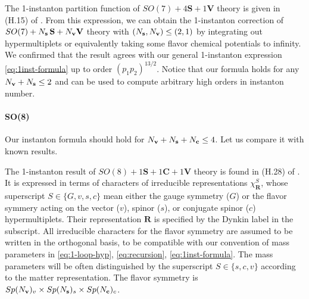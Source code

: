 \documentclass[letterpaper, 11pt]{article}
\begin{document}
{The 1-instanton partition function of $SO(7) + 4\mathbf{S} + 1\mathbf{V}$ theory is given in (H.15) of \cite{DelZotto:2018tcj}.
From this expression, we can obtain the 1-instanton correction of $SO(7) + N_{\bf s}\,\mathbf{S} + N_{\bf v}\mathbf{V}$ theory with $( N_{\bf s}, N_{\bf v}) \leq ( 2,1)$ by integrating out hypermultiplets or equivalently taking some flavor chemical potentials to infinity. We confirmed that the result agrees with our general 1-instanton expression \eqref{eq:1inst-formula} up to order $(p_1p_2)^{13/2}$. Notice that our formula holds for any $N_{\bf v} + N_{\bf s} \le 2$ and can be used to compute arbitrary high orders in instanton number. 

\paragraph{SO(8)}
Our instanton formula should hold for $N_{\bf v} + N_{\bf s} + N_{\bf c} \le 4$. Let us compare it with known results. 

The 1-instanton result of $SO(8) + 1\mathbf{S} + 1\mathbf{C} + 1\mathbf{V}$ theory is found in (H.28) of \cite{DelZotto:2018tcj}.
It is expressed in terms of characters of irreducible representations $\chi_{\mathbf{R}}^S$, whose superscript $S \in \{G,v,s,c\}$ mean either the gauge symmetry ($G$) or the flavor symmery acting on the vector ($v$), spinor ($s$), or conjugate spinor ($c$) hypermultiplets. Their representation $\mathbf{R}$ is specified by the Dynkin label in the subscript. All irreducible characters for the flavor symmetry are assumed to be written in the orthogonal basis, to be compatible with our convention of mass parameters in \eqref{eq:1-loop-hyp}, \eqref{eq:recursion}, \eqref{eq:1inst-formula}. The mass parameters will be often distinguished by the superscript $S \in \{s,c,v\}$ according to the matter representation. The flavor symmetry is $Sp(N_{\bf v})_v \times Sp(N_{\bf s})_s \times Sp(N_{\bf c})_c$.

}
\end{document}
